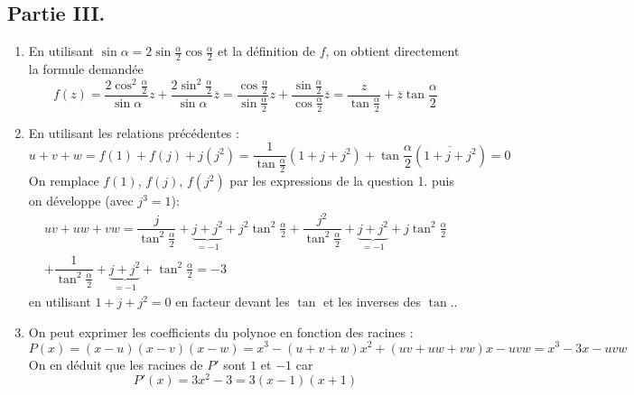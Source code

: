 \subsection*{Partie III.}
\begin{enumerate}
 \item En utilisant $\sin \alpha = 2\sin \frac{\alpha}{2}\cos\frac{\alpha}{2}$ et la définition de $f$, on obtient directement la formule demandée
\begin{displaymath}
 f(z)=\dfrac{2\cos^2\frac{\alpha}{2}}{\sin \alpha}z + \dfrac{2\sin^2\frac{\alpha}{2}}{\sin \alpha}\overline{z}
=\dfrac{\cos \frac{\alpha}{2}}{\sin \frac{\alpha}{2}}z + \dfrac{\sin \frac{\alpha}{2}}{\cos \frac{\alpha}{2}}\overline{z}
= \dfrac{z}{\tan \frac{\alpha}{2}}+\overline{z}\tan \frac{\alpha}{2}
\end{displaymath}

\item En utilisant les relations précédentes :
\begin{displaymath}
 u+v+w = f(1)+f(j)+j(j^2) 
= \dfrac{1}{\tan\frac{\alpha}{2}} (1+j+j^2) + \tan\frac{\alpha}{2} (\overline{1+j+j^2}) = 0
\end{displaymath}
On remplace $f(1)$, $f(j)$, $f(j^2)$ par les expressions de la question 1. puis on développe (avec $j^3=1$):
\begin{multline*}
 uv+uw+vw = 
\dfrac{j}{\tan^2\frac{\alpha}{2}} + \underset{=-1}{\underbrace{ j + j^2}} + j^2\tan^2\frac{\alpha}{2} + \dfrac{j^2}{\tan^2\frac{\alpha}{2}} + \underset{=-1}{\underbrace{ j + j^2}} + j\tan^2\frac{\alpha}{2} \\ + \dfrac{1}{\tan^2\frac{\alpha}{2}} + \underset{=-1}{\underbrace{ j + j^2}} + \tan^2\frac{\alpha}{2}
= - 3
\end{multline*}
en utilisant $1+j+j^2=0$ en facteur devant les $\tan$ et les inverses des $\tan$..
\item On peut exprimer les coefficients du polynoe en fonction des racines :
\begin{displaymath}
 P(x)=(x-u)(x-v)(x-w)=x^3-(u+v+w)x^2+(uv+uw+vw)x-uvw=x^3-3x-uvw
\end{displaymath}
On en déduit que les racines de $P'$ sont $1$ et $-1$ car
\begin{displaymath}
 P'(x)=3x^2-3=3(x-1)(x+1)
\end{displaymath}

\end{enumerate}
